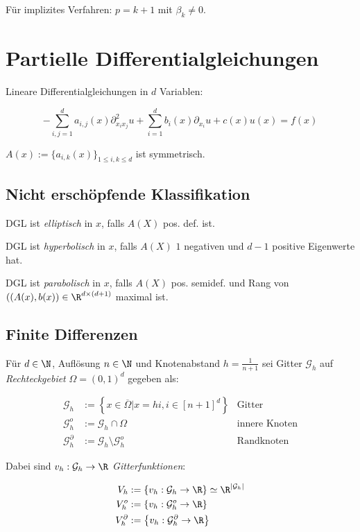 Für implizites Verfahren: $p = k+1$ mit $\beta_k \neq 0$.

\section*{Partielle Differentialgleichungen}

Lineare Differentialgleichungen in $d$ Variablen:

\vspace*{-4mm}
\[ -\sum_{i,j=1}^d a_{i,j}(x)\partial_{x_i x_j}^2 u + \sum_{i=1}^d b_i(x) \partial_{x_i} u + c(x)u(x) = f(x) \]

$A(x) := \{a_{i,k}(x)\}_{1\leq i,k \leq d}$ ist symmetrisch.

\subsection*{Nicht erschöpfende Klassifikation}

DGL ist \emph{elliptisch} in $x$, falls $A(X)$ pos. def. ist.

\spacing

DGL ist \emph{hyperbolisch} in $x$, falls $A(X)$ $1$ negativen und $d-1$ positive Eigenwerte hat.

\spacing

DGL ist \emph{parabolisch} in $x$, falls $A(X)$ pos. semidef. und Rang von $((A(x),b(x)) \in \R^{d \times (d+1)}$ maximal ist.


\subsection*{Finite Differenzen}

Für $d \in \N$, Auflösung $n \in \N$ und Knotenabstand $h = \frac{1}{n+1}$ sei  Gitter $\mathcal{G}_h$ auf \emph{Rechteckgebiet} $\Omega = (0,1)^d$ gegeben als:

\vspace*{-4mm}
\begin{align*}
	\mathcal{G}_h &:= \left\{ x \in \overline\Omega | x = hi, i \in [n+1]^d\right\} &\text{Gitter} \\
\mathcal{G}_h^o &:= \mathcal{G}_h \cap \Omega &\text{innere Knoten} \\
\mathcal{G}_h^\partial &:= \mathcal{G}_h \setminus \mathcal{G}_h^o &\text{Randknoten}
\end{align*}

Dabei sind $v_h : \mathcal{G}_h \to \R$ \emph{Gitterfunktionen}:

\vspace*{-4mm}
\begin{align*}
V_h &:= \left\{ v_h : \mathcal{G}_h \to \R \right\} \simeq \R^{|\mathcal{G}_h|} \\
V_h^o &:= \left\{ v_h : \mathcal{G}_h^o \to \R \right\} \\
V_h^\partial &:= \left\{ v_h : \mathcal{G}_h^\partial \to \R \right\}
\end{align*}

